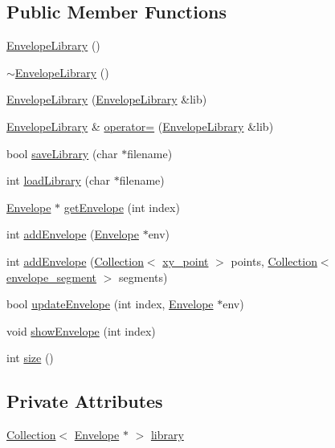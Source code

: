 \subsection*{Public Member Functions}
\begin{CompactItemize}
\item 
\hyperlink{classEnvelopeLibrary_a0}{Envelope\-Library} ()
\item 
\hyperlink{classEnvelopeLibrary_a1}{$\sim$Envelope\-Library} ()
\item 
\hyperlink{classEnvelopeLibrary_a2}{Envelope\-Library} (\hyperlink{classEnvelopeLibrary}{Envelope\-Library} \&lib)
\item 
\hyperlink{classEnvelopeLibrary}{Envelope\-Library} \& \hyperlink{classEnvelopeLibrary_a3}{operator=} (\hyperlink{classEnvelopeLibrary}{Envelope\-Library} \&lib)
\item 
bool \hyperlink{classEnvelopeLibrary_a4}{save\-Library} (char $\ast$filename)
\item 
int \hyperlink{classEnvelopeLibrary_a5}{load\-Library} (char $\ast$filename)
\item 
\hyperlink{classEnvelope}{Envelope} $\ast$ \hyperlink{classEnvelopeLibrary_a6}{get\-Envelope} (int index)
\item 
int \hyperlink{classEnvelopeLibrary_a7}{add\-Envelope} (\hyperlink{classEnvelope}{Envelope} $\ast$env)
\item 
int \hyperlink{classEnvelopeLibrary_a8}{add\-Envelope} (\hyperlink{classCollection}{Collection}$<$ \hyperlink{structxy__point}{xy\_\-point} $>$ points, \hyperlink{classCollection}{Collection}$<$ \hyperlink{structenvelope__segment}{envelope\_\-segment} $>$ segments)
\item 
bool \hyperlink{classEnvelopeLibrary_a9}{update\-Envelope} (int index, \hyperlink{classEnvelope}{Envelope} $\ast$env)
\item 
void \hyperlink{classEnvelopeLibrary_a10}{show\-Envelope} (int index)
\item 
int \hyperlink{classEnvelopeLibrary_a11}{size} ()
\end{CompactItemize}
\subsection*{Private Attributes}
\begin{CompactItemize}
\item 
\hyperlink{classCollection}{Collection}$<$ \hyperlink{classEnvelope}{Envelope} $\ast$ $>$ \hyperlink{classEnvelopeLibrary_r0}{library}
\end{CompactItemize}


